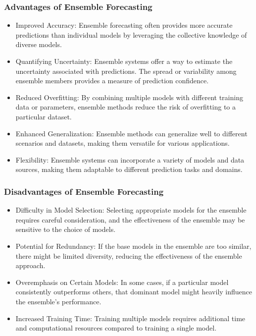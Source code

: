 \documentclass[../paper.tex]{subfiles}
\begin{document}
    \subsubsection{Advantages of Ensemble Forecasting}
    \begin{itemize}
        \item Improved Accuracy:
        Ensemble forecasting often provides more accurate predictions than individual models
        by leveraging the collective knowledge of diverse models.

        \item Quantifying Uncertainty: Ensemble systems offer a way to estimate the uncertainty associated with predictions.
        The spread or variability among ensemble members provides a measure of prediction confidence.

        \item Reduced Overfitting:
        By combining multiple models with different training data or parameters,
        ensemble methods reduce the risk of overfitting to a particular dataset.

        \item Enhanced Generalization: Ensemble methods can generalize well to different scenarios and datasets,
        making them versatile for various applications.

        \item Flexibility: Ensemble systems can incorporate a variety of models and data sources,
        making them adaptable to different prediction tasks and domains.
    \end{itemize}

    \subsubsection{Disadvantages of Ensemble Forecasting}
    \begin{itemize}
        \item Difficulty in Model Selection:
        Selecting appropriate models for the ensemble requires careful consideration,
        and the effectiveness of the ensemble may be sensitive to the choice of models.

        \item Potential for Redundancy: If the base models in the ensemble are too similar,
        there might be limited diversity, reducing the effectiveness of the ensemble approach.

        \item Overemphasis on Certain Models:
        In some cases, if a particular model consistently outperforms others,
        that dominant model might heavily influence the ensemble's performance.

        \item Increased Training Time:
        Training multiple models requires additional time and computational resources compared to training a single model.
    \end{itemize}
\end{document}
